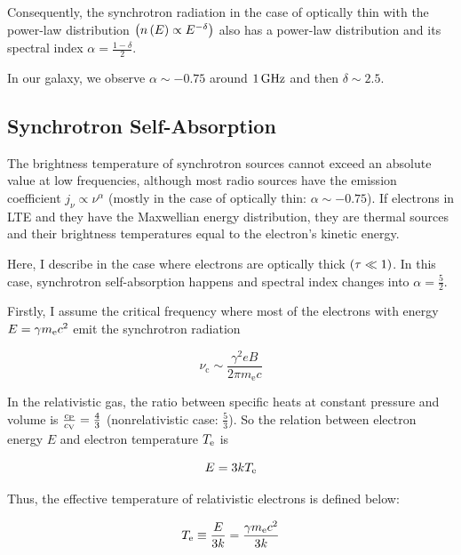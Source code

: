 Consequently, the synchrotron radiation in the case of optically thin with the power-law distribution $\left(n\left(E\right) \propto E^{-\delta}\right)$ also has a power-law distribution and its spectral index $\alpha = \frac{1-\delta}{2}$.

In our galaxy, we observe $\alpha\sim-0.75$ around $1\,\mathrm{GHz}$ and then $\delta \sim 2.5$.



\subsection{Synchrotron Self-Absorption}\label{synchrotronselfabsorption}

The brightness temperature of synchrotron sources cannot exceed an absolute value at low frequencies, although most radio sources have the emission coefficient $j_{\nu} \propto \nu^{\alpha}$ (mostly in the case of optically thin: $\alpha\sim-0.75$).
If electrons in LTE and they have the Maxwellian energy distribution, they are thermal sources and their brightness temperatures equal to the electron's kinetic energy.

Here, I describe in the case where electrons are optically thick $\left(\tau \ll 1\right)$.
In this case, synchrotron self-absorption happens and spectral index changes into $\alpha = \frac{5}{2}$.

Firstly, I assume the critical frequency where most of the electrons with energy $E = \gamma m_{\mathrm{e}} c^2$ emit the synchrotron radiation

\begin{equation}\label{eq:essential_radio5n80}
    \nu_{\mathrm{c}} \sim \frac{\gamma^{2} e B}{2 \pi m_{\mathrm{e}} c}
\end{equation}

In the relativistic gas, the ratio between specific heats at constant pressure and volume is $\frac{c_{\mathrm{P}}}{c_{\mathrm{V}}}=\frac{4}{3}$ (nonrelativistic case: $\frac{5}{3}$).
So the relation between electron energy $E$ and electron temperature $T_{\mathrm{e}}$ is

\begin{equation}\label{eq:essential_radio5n82}
    E=3 k T_{\mathrm{e}}
\end{equation}

Thus, the effective temperature of relativistic electrons is defined below:

\begin{equation}\label{eq:essential_radio5n83}
    T_{\mathrm{e}} \equiv \frac{E}{3 k}=\frac{\gamma m_{\mathrm{e}} c^2}{3 k}
\end{equation}

